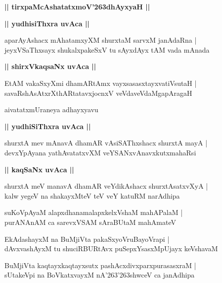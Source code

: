 \documentclass[twoside,12pt,openright]{book}
\def\S{\char'263}
\newcounter{shloka}[chapter]
\def\uvaca#1{\centerline{{\large\textbf{#1}}}}
\begin{document}
\begin{center}
{\LARGE\bfseries || tirxpaMcAshatatxmoV\S dhAyxyaH ||}
\end{center}

\uvaca{|| yudhisiThxra uvAca ||}

\begin{shloka}%
aparAyAshacx mAhatamxyXM shurxtaM sarvxM janAdaRna |\\
jeyxVSaThxsayx shukalxpakeSxV tu sAyxdAyx tAM vada mAnada 
\end{shloka}

\uvaca{|| shirxVkaqsaNx uvAca ||}

\begin{shloka}%
EtAM vakaSxyXmi dhamARtAmx vayxsasasxtayxvatiVsutaH |\\
savaRshAsAtxrXthARtatavxjocnxV veVdaveVdaMgapAragaH
\end{shloka}

\begin{center}
aivatatxmUraneya adhayxyavu
\end{center}

\uvaca{|| yudhiSiThxra uvAca ||}

\begin{shloka}%
shurxtA mev mAnavA dhamAR vAsiSAThxshacx shurxtA mayA |\\
devxYpAyana yathAvatatxvXM veYSANxvAnavxkutxmahaRsi 
\end{shloka}

\uvaca{|| kaqSaNx uvAca ||}

\begin{shloka}%
shurxtA meV manavA dhamAR veYdikAshacx shurxtAsatxvXyA |\\
kalw yegeV na shakayxMteV teV veY katuRM narAdhipa
\end{shloka}

\begin{shloka}%
suKoVpAyaM alapxdhanamalapxkelxVshaM mahAPalaM |\\
purANAnAM ca sarevxVSAM sAraBUtaM mahAmateV 
\end{shloka}

\begin{shloka}%
EkAdashayxM na BuMjiVta pakaSxyoVruBayoVrapi |\\
dAvxvashAyxM tu shuciRBURtAvx puSepxYsasxMpUjayx keVshavaM 
\end{shloka}

\begin{shloka}%
BuMjiVta kaqtayxkaqtayxsutx pashAcxdivxparxpurasasxraM |\\
sUtakeVpi na BoVkatxvayxM nA\S\S shwceV ca janAdhipa
\end{shloka}
\end{document}
